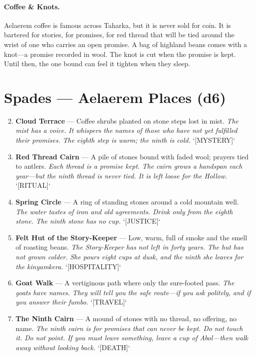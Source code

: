 \paragraph{Coffee \& Knots.} Aelaerem coffee is famous across Taharka, but it is never sold for coin. It is bartered for stories, for promises, for red thread that will be tied around the wrist of one who carries an open promise. A bag of highland beans comes with a knot---a promise recorded in wool. The knot is cut when the promise is kept. Until then, the one bound can feel it tighten when they sleep.

\section*{Spades --- Aelaerem Places (d6)}
\label{subsec:aelaerem-places}
\begin{enumerate}
\setcounter{enumi}{1}
\item \textbf{Cloud Terrace} --- Coffee shrubs planted on stone steps lost in mist.
  \hfill \textit{The mist has a voice. It whispers the names of those who have not yet fulfilled their promises. The eighth step is warm; the ninth is cold.} `[MYSTERY]`
\item \textbf{Red Thread Cairn} --- A pile of stones bound with faded wool; prayers tied to antlers.
  \hfill \textit{Each thread is a promise kept. The cairn grows a handspan each year---but the ninth thread is never tied. It is left loose for the Hollow.} `[RITUAL]`
\item \textbf{Spring Circle} --- A ring of standing stones around a cold mountain well.
  \hfill \textit{The water tastes of iron and old agreements. Drink only from the eighth stone. The ninth stone has no cup.} `[JUSTICE]`
\item \textbf{Felt Hut of the Story-Keeper} --- Low, warm, full of smoke and the smell of roasting beans.
  \hfill \textit{The Story-Keeper has not left in forty years. The hut has not grown colder. She pours eight cups at dusk, and the ninth she leaves for the \textit{kinyamkera}.} `[HOSPITALITY]`
\item \textbf{Goat Walk} --- A vertiginous path where only the sure-footed pass.
  \hfill \textit{The goats have names. They will tell you the safe route---if you ask politely, and if you answer their \textit{fumbo}.} `[TRAVEL]`
\item \textbf{The Ninth Cairn} --- A mound of stones with no thread, no offering, no name.
  \hfill \textit{The ninth cairn is for promises that can never be kept. Do not touch it. Do not point. If you must leave something, leave a cup of \textit{Abol}---then walk away without looking back.} `[DEATH]`
\end{enumerate}

